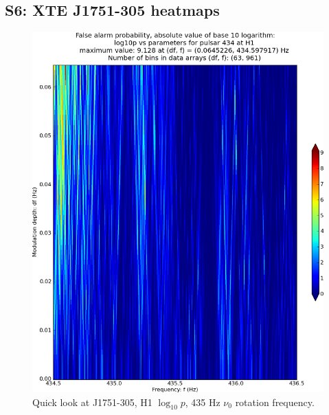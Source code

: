 \subsection{S6: XTE J1751-305 heatmaps}

\begin{figure}
\begin{center}
\includegraphics[width=0.68\paperwidth,height=0.48\paperheight]{plots/DFvsFresultsProb-H1_pulsar-434.eps}
\caption{
Quick look at J1751-305, H1 $\log_{10}p$, 435 Hz $\nu_0$ rotation frequency.}
\end{center}
\end{figure}


